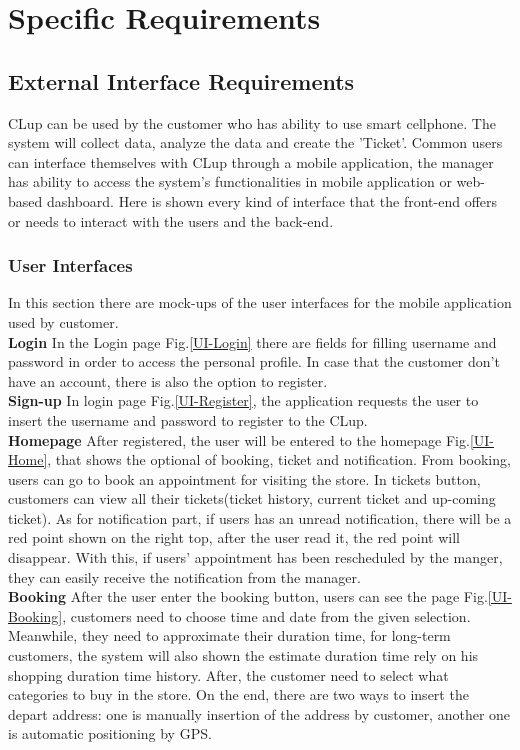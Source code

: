 \documentclass[a4paper,12pt]{report}
\begin{document}
\chapter{Specific Requirements} \label{C3:SpecificRequirements}

\section{External Interface Requirements}
CLup can be used by the customer who has ability to use smart cellphone. The system will
collect data, analyze the data and create the 'Ticket'. Common users can interface themselves with CLup through a mobile application, the manager has ability to access the system’s functionalities in mobile application or web-based dashboard. Here is shown every kind of
interface that the front-end offers or needs to interact with the users and the back-end.
\subsection{User Interfaces}
In this section there are mock-ups of the user interfaces for the mobile application used
by customer.\\

\textbf{Login} In the Login page Fig.\ref{UI-Login} there are fields for filling username and password in order to access the personal profile. In case that the customer don't have an account, there is also the option to register.\\

\textbf{Sign-up} In login page Fig.\ref{UI-Register}, the application requests the user to insert the username and password to register to the CLup.\\


\textbf{Homepage} After registered, the user will be entered to the homepage Fig.\ref{UI-Home}, that shows the optional of booking, ticket and notification. From booking, users can go to book an appointment for visiting the store. In tickets button, customers can view all their tickets(ticket history, current ticket and up-coming ticket). As for notification part, if users has an unread notification, there will be a red point shown on the right top, after the user read it, the red point will disappear. With this, if users' appointment has been rescheduled by the manger, they can easily receive the notification from the manager.\\


\textbf{Booking} After the user enter the booking button, users can see the page Fig.\ref{UI-Booking}, customers need to choose time and date from the given selection. Meanwhile, they need to approximate their duration time, for long-term customers, the system will also shown the estimate duration time rely on his shopping duration time history. After, the customer need to select what categories to buy in the store. On the end, there are two ways to insert the depart address: one is manually insertion of the address by customer, another one is automatic positioning by GPS.\\
\end{document}

